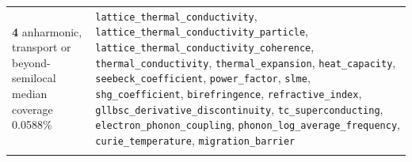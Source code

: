 \begin{table}[htbp]
\begin{tabular}{p{}p{}}
\addlinespace[3pt]
\textbf{4} anharmonic, transport or beyond-semilocal \newline median coverage 0.0588\% & \texttt{lattice\_thermal\_conductivity}, \texttt{lattice\_thermal\_conductivity\_particle}, \texttt{lattice\_thermal\_conductivity\_coherence}, \texttt{thermal\_conductivity}, \texttt{thermal\_expansion}, \texttt{heat\_capacity}, \texttt{seebeck\_coefficient}, \texttt{power\_factor}, \texttt{slme}, \texttt{shg\_coefficient}, \texttt{birefringence}, \texttt{refractive\_index}, \texttt{gllbsc\_derivative\_discontinuity}, \texttt{tc\_superconducting}, \texttt{electron\_phonon\_coupling}, \texttt{phonon\_log\_average\_frequency}, \texttt{curie\_temperature}, \texttt{migration\_barrier} \\
\addlinespace[3pt]
\bottomrule
\end{tabular}
\end{table}

